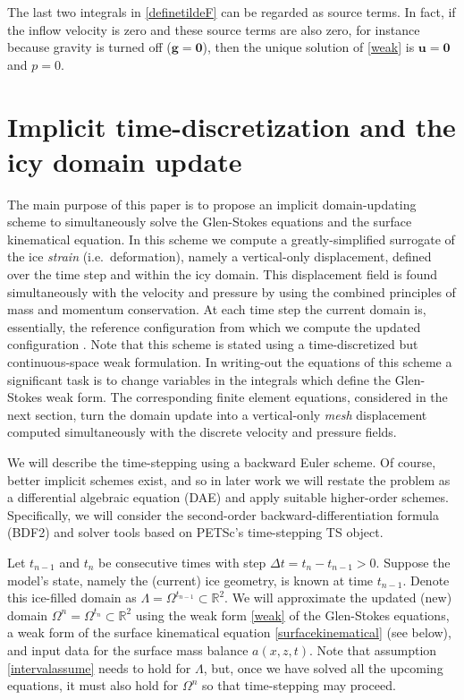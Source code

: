 \documentclass[letterpaper,final,12pt,reqno]{amsart}
\newcommand{\RR}{\mathbb{R}}
\newcommand{\bg}{\mathbf{g}}
\newcommand{\bu}{\mathbf{u}}
\newcommand{\bzero}{\bm{0}}
\begin{document}
The last two integrals in \eqref{definetildeF} can be regarded as source terms.  In fact, if the inflow velocity is zero and these source terms are also zero, for instance because gravity is turned off ($\bg=\bzero$), then the unique solution of \eqref{weak} is $\bu=\bzero$ and $p=0$.


\section{Implicit time-discretization and the icy domain update} \label{sec:implicitstep}

The main purpose of this paper is to propose an implicit domain-updating scheme to simultaneously solve the Glen-Stokes equations and the surface kinematical equation.  In this scheme we compute a greatly-simplified surrogate of the ice \emph{strain} (i.e.~deformation), namely a vertical-only displacement, defined over the time step and within the icy domain.  This displacement field is found simultaneously with the velocity and pressure by using the combined principles of mass and momentum conservation.  At each time step the current domain is, essentially, the reference configuration from which we compute the updated configuration \cite{GreveBlatter2009}.  Note that this scheme is stated using a time-discretized but continuous-space weak formulation.  In writing-out the equations of this scheme a significant task is to change variables in the integrals which define the Glen-Stokes weak form.  The corresponding finite element equations, considered in the next section, turn the domain update into a vertical-only \emph{mesh} displacement computed simultaneously with the discrete velocity and pressure fields.

We will describe the time-stepping using a backward Euler scheme.  Of course, better implicit schemes exist, and so in later work we will restate the problem as a differential algebraic equation (DAE) and apply suitable higher-order schemes.  Specifically, we will consider the second-order backward-differentiation formula (BDF2) \cite{AscherPetzold1998} and solver tools based on PETSc's \cite{Balayetal2020,BuelerBook} time-stepping TS object.

Let $t_{n-1}$ and $t_n$ be consecutive times with step $\Delta t = t_n - t_{n-1} > 0$.  Suppose the model's state, namely the (current) ice geometry, is known at time $t_{n-1}$.  Denote this ice-filled domain as $\Lambda = \Omega^{t_{n-1}} \subset \RR^2$.  We will approximate the updated (new) domain $\Omega^n = \Omega^{t_n} \subset \RR^2$ using the weak form \eqref{weak} of the Glen-Stokes equations, a weak form of the surface kinematical equation \eqref{surfacekinematical} (see below), and input data for the surface mass balance $a(x,z,t)$.  Note that assumption \eqref{intervalassume} needs to hold for $\Lambda$, but, once we have solved all the upcoming equations, it must also hold for $\Omega^n$ so that time-stepping may proceed.
\end{document}
